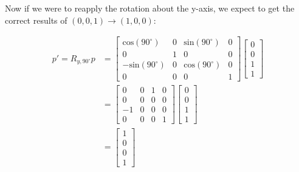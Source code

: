 \documentclass[12pt,letterpaper]{article}
\begin{document}
\newpage

Now if we were to reapply the rotation about the y-axis, we expect to get the correct results of $(0, 0, 1) \rightarrow (1, 0, 0)$:

\begin{equation}
    \begin{aligned}
    p' = R_{y, 90^{\circ}}p
    &= \begin{bmatrix}
        \text{cos}(90^{\circ})    & 0     & \text{sin}(90^{\circ}) & 0 \\
        0                         & 1     &  0                      & 0 \\
       -\text{sin}(90^{\circ})    & 0     &  \text{cos}(90^{\circ}) & 0 \\
        0                         & 0     &  0                      & 1
    \end{bmatrix}
     \begin{bmatrix}
        0 \\
        0 \\
        1 \\
        1
    \end{bmatrix} \\
    &= \begin{bmatrix}
        0 & 0 &  1 & 0 \\
        0 & 0 &  0 & 0 \\
       -1 & 0 &  0 & 0 \\
        0 & 0 &  0 & 1
    \end{bmatrix}
     \begin{bmatrix}
        0 \\
        0 \\
        1 \\
        1
    \end{bmatrix} \\
    &= \begin{bmatrix}
        1 \\
        0 \\
        0 \\
        1
    \end{bmatrix}
    \end{aligned}
\end{equation}
\end{document}
